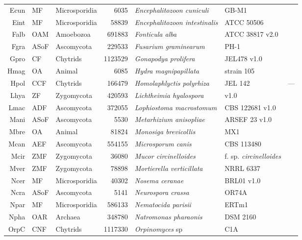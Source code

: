 {{{\begin{longtable}{rllrlll}
  Ecun & MF & Microsporidia & 6035 & \emph{Encephalitozoon cuniculi} & GB-M1 & \cite{Aurrecoechea2010} \\ 
  Eint & MF & Microsporidia & 58839 & \emph{Encephalitozoon intestinalis} & ATCC 50506 & \cite{Aurrecoechea2010} \\ 
  Falb & OAM & Amoebozoa & 691883 & \emph{Fonticula alba} & ATCC 38817 v2.0 & \cite{RuizTrillo2007} \\ 
  Fgra & ASoF & Ascomycota & 229533 & \emph{Fusarium graminearum } & PH-1 & \cite{Stajich2012FungiDB} \\ 
  Gpro & CF & Chytrids & 1123529 & \emph{Gonapodya prolifera} & JEL478 v1.0 & \cite{Chang2015} \\ 
  Hmag & OA & Animal & 6085 & \emph{Hydra magnipapillata} & strain 105 & \cite{Chapman2010} \\ 
  Hpol & CCF & Chytrids & 166479 & \emph{Homolaphlyctis polyrhiza} & JEL 142 & --- \\ 
  Lhya & ZF & Zygomycota & 420593 & \emph{Lichtheimia hyalospora} & v1.0 & \cite{Lhya} \\ 
  Lmac & ADF & Ascomycota & 372055 & \emph{Lophiostoma macrostomum} & CBS 122681 v1.0 & \cite{Lmac} \\ 
  Mani & ASoF & Ascomycota & 5530 & \emph{Metarhizium anisopliae} & ARSEF 23 v1.0 & \cite{Gao2011} \\ 
  Mbre & OA & Animal & 81824 & \emph{Monosiga brevicollis} & MX1 & \cite{RuizTrillo2007} \\ 
  Mcan & AEF & Ascomycota & 554155 & \emph{Microsporum canis} & CBS 113480 & \cite{Martinez2012} \\ 
  Mcir & ZMF & Zygomycota & 36080 & \emph{Mucor circinelloides} & f. sp. \emph{circinelloides} & \cite{Lee2014} \\ 
  Mver & ZMF & Zygomycota & 78898 & \emph{Mortierella verticillata} & NRRL 6337 & \cite{RuizTrillo2007} \\ 
  Ncer & MF & Microsporidia & 40302 & \emph{Nosema ceranae} & BRL01 v1.0 & \cite{Cornman2009} \\ 
  Ncra & ASoF & Ascomycota & 5141 & \emph{Neurospora crassa} & OR74A & \cite{Stajich2012FungiDB} \\ 
  Npar & MF & Microsporidia & 586133 & \emph{Nematocida parisii} & ERTm1 & \cite{Cuomo2012} \\ 
  Npha & OAR & Archaea & 348780 & \emph{Natromonas pharaonis} & DSM 2160 & \cite{Falb2005} \\ 
  OrpC & CNF & Chytrids & 1117330 & \emph{Orpinomyces} sp & C1A & \cite{Youssef2013} \\ 

\end{longtable}}}}
